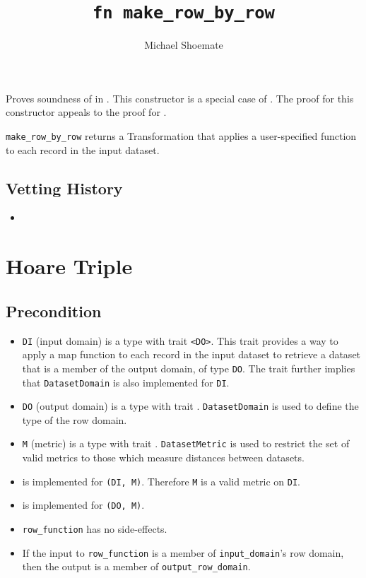 \documentclass{article}
\title{\texttt{fn make\_row\_by\_row}}
\author{Michael Shoemate}
\date{}
\begin{document}
\maketitle

\contrib
Proves soundness of  in .
This constructor is a special case of .
The proof for this constructor appeals to the proof for .

\texttt{make\_row\_by\_row} returns a Transformation that applies a user-specified function to each record in the input dataset.

\subsection*{Vetting History}
\begin{itemize}
    \item {}
\end{itemize}

\section{Hoare Triple}
\subsection*{Precondition}
\begin{itemize}

    \item \texttt{DI} (input domain) is a type with trait \texttt{<DO>}.
        This trait provides a way to apply a map function to each record in the input dataset to retrieve a dataset that is a member of the output domain, of type \texttt{DO}. The trait further implies that \texttt{DatasetDomain} is also implemented for \texttt{DI}.
    \item \texttt{DO} (output domain) is a type with trait .
        \texttt{DatasetDomain} is used to define the type of the row domain.
    \item \texttt{M} (metric) is a type with trait .
        \texttt{DatasetMetric} is used to restrict the set of valid metrics to those which measure distances between datasets.
    \item {} is implemented for \texttt{(DI, M)}. Therefore \texttt{M} is a valid metric on \texttt{DI}.
    \item {} is implemented for \texttt{(DO, M)}.
    \item \texttt{row\_function} has no side-effects.
    \item If the input to \texttt{row\_function} is a member of \texttt{input\_domain}'s row domain, then the output is a member of \texttt{output\_row\_domain}.
\end{itemize}
\end{document}

